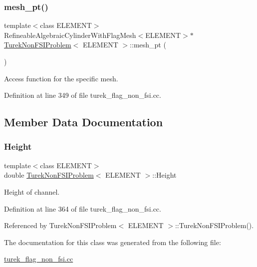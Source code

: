 \subsubsection{\texorpdfstring{mesh\+\_\+pt()}{mesh\_pt()}\hspace{0.1cm}{\footnotesize\ttfamily [2/2]}}
{\footnotesize\ttfamily template$<$class E\+L\+E\+M\+E\+NT$>$ \\
Refineable\+Algebraic\+Cylinder\+With\+Flag\+Mesh$<$E\+L\+E\+M\+E\+NT$>$$\ast$ \hyperlink{classTurekNonFSIProblem}{Turek\+Non\+F\+S\+I\+Problem}$<$ E\+L\+E\+M\+E\+NT $>$\+::mesh\+\_\+pt (\begin{DoxyParamCaption}{ }\end{DoxyParamCaption})\hspace{0.3cm}{\ttfamily [inline]}}



Access function for the specific mesh. 



Definition at line 349 of file turek\+\_\+flag\+\_\+non\+\_\+fsi.\+cc.



\subsection{Member Data Documentation}
\mbox{\label{classTurekNonFSIProblem_a7e85e76876a9b1136cc340b0bb25e299}} 
\subsubsection{\texorpdfstring{Height}{Height}}
{\footnotesize\ttfamily template$<$class E\+L\+E\+M\+E\+NT$>$ \\
double \hyperlink{classTurekNonFSIProblem}{Turek\+Non\+F\+S\+I\+Problem}$<$ E\+L\+E\+M\+E\+NT $>$\+::Height\hspace{0.3cm}{\ttfamily [private]}}



Height of channel. 



Definition at line 364 of file turek\+\_\+flag\+\_\+non\+\_\+fsi.\+cc.



Referenced by Turek\+Non\+F\+S\+I\+Problem$<$ E\+L\+E\+M\+E\+N\+T $>$\+::\+Turek\+Non\+F\+S\+I\+Problem().



The documentation for this class was generated from the following file\+:\begin{DoxyCompactItemize}
\item 
\hyperlink{turek__flag__non__fsi_8cc}{turek\+\_\+flag\+\_\+non\+\_\+fsi.\+cc}\end{DoxyCompactItemize}
